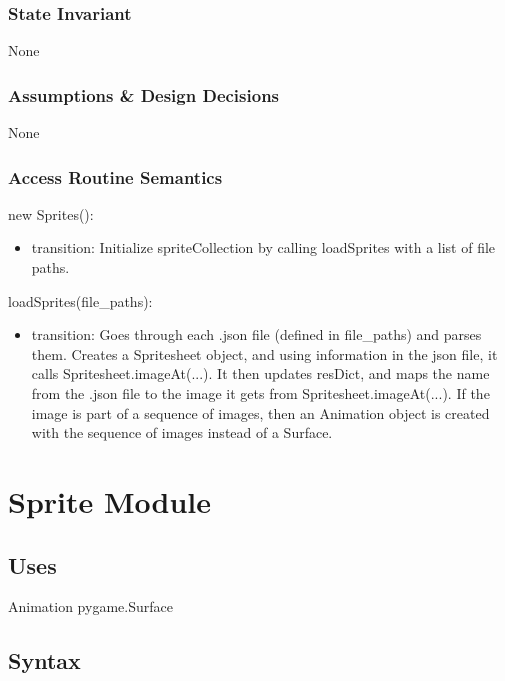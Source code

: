 \documentclass[12pt]{article}
\begin{document}
\subsubsection* {State Invariant}

None

\subsubsection* {Assumptions \& Design Decisions}

None

\subsubsection* {Access Routine Semantics}

new Sprites():
\begin{itemize}
    \item transition: Initialize spriteCollection by calling loadSprites with a list of file paths.
\end{itemize}

loadSprites(file\_paths):
\begin{itemize}
    \item transition: Goes through each .json file (defined in file\_paths) and parses them. Creates a Spritesheet object, and using information in the json file, it calls Spritesheet.imageAt(...). It then updates resDict, and maps the name from the .json file to the image it gets from Spritesheet.imageAt(...). If the image is part of a sequence of images, then an Animation object is created with the sequence of images instead of a Surface. 
\end{itemize}

\newpage

\section* {Sprite Module}

\subsection* {Uses}

Animation
pygame.Surface

\subsection* {Syntax}
\end{document}
